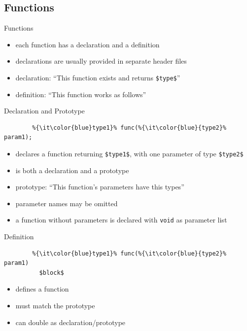 \documentclass[english,compress]{beamer}
\begin{document}
\subsection{Functions}
\begin{frame}{Functions}
	\begin{itemize}
		\item each function has a declaration and a definition
		\item declarations are usually provided in separate header files
		\item declaration: ``This function exists and returns {\color{blue}\lstinline|$type$|}''
		\item definition: ``This function works as follows''
	\end{itemize}
\end{frame}

\begin{frame}[fragile]{Declaration and Prototype}
	\begin{lstlisting}
		%{\it\color{blue}type1}% func(%{\it\color{blue}{type2}% param1);
	\end{lstlisting}
	\begin{itemize}
		\item declares a function returning {\color{blue}\lstinline|$type1$|}, with one parameter of type {\color{blue}\lstinline|$type2$|}
		\item is both a declaration and a prototype
		\item prototype: ``This function's parameters have this types''
		\item parameter names may be omitted
		\item a function without parameters is declared with \lstinline|void| as parameter list
	\end{itemize}
\end{frame}

\begin{frame}[fragile]{Definition}
	\begin{lstlisting}
		%{\it\color{blue}type1}% func(%{\it\color{blue}{type2}% param1)
		  $block$
	\end{lstlisting}
	\begin{itemize}
		\item defines a function
		\item must match the prototype
		\item can double as declaration/prototype
	\end{itemize}
\end{frame}
\end{document}
